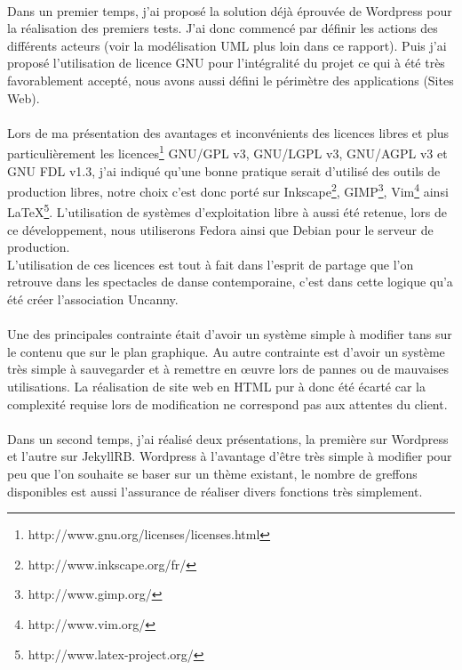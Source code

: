 \documentclass[11pt,a4paper]{report}
\begin{document}
		\paragraph*{}Dans un premier temps, j'ai proposé la solution déjà éprouvée de Wordpress pour la réalisation des premiers tests. J'ai donc commencé par définir les actions des différents acteurs (voir la modélisation UML plus loin dans ce rapport). Puis j'ai proposé l'utilisation de licence GNU pour l'intégralité du projet ce qui à été très favorablement accepté, nous avons aussi défini le périmètre des applications (Sites Web).
		\paragraph*{}Lors de ma présentation des avantages et inconvénients des licences libres et plus particulièrement les licences\footnote{http://www.gnu.org/licenses/licenses.html} GNU/GPL v3, GNU/LGPL v3, GNU/AGPL v3 et GNU FDL v1.3, j'ai indiqué qu'une bonne pratique serait d'utilisé des outils de production libres, notre choix c'est donc porté sur Inkscape\footnote{http://www.inkscape.org/fr/}, GIMP\footnote{http://www.gimp.org/}, Vim\footnote{http://www.vim.org/} ainsi \LaTeX \footnote{http://www.latex-project.org/}. L'utilisation de systèmes d'exploitation libre à aussi été retenue, lors de ce développement, nous utiliserons Fedora ainsi que Debian pour le serveur de production.\\
		L'utilisation de ces licences est tout à fait dans l'esprit de partage que l'on retrouve dans les spectacles de danse contemporaine, c'est dans cette logique qu'a été créer l'association Uncanny.
		\paragraph*{}Une des principales contrainte était d'avoir un système simple à modifier tans sur le contenu que sur le plan graphique. Au autre contrainte est d'avoir un système très simple à sauvegarder et à remettre en œuvre lors de pannes ou de mauvaises utilisations. La réalisation de site web en HTML pur à donc été écarté car la complexité requise lors de modification ne correspond pas aux attentes du client.
		\paragraph*{}Dans un second temps, j'ai réalisé deux présentations, la première sur Wordpress et l'autre sur JekyllRB.
		Wordpress à l'avantage d'être très simple à modifier pour peu que l'on souhaite se baser sur un thème existant, le nombre de greffons disponibles est aussi l'assurance de réaliser divers fonctions très simplement.
\end{document}
